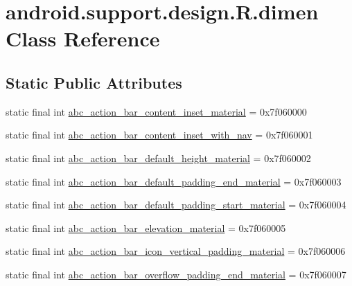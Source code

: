\hypertarget{classandroid_1_1support_1_1design_1_1_r_1_1dimen}{}\section{android.\+support.\+design.\+R.\+dimen Class Reference}
\label{classandroid_1_1support_1_1design_1_1_r_1_1dimen}
\subsection*{Static Public Attributes}
\begin{DoxyCompactItemize}
\item 
static final int \mbox{\hyperlink{classandroid_1_1support_1_1design_1_1_r_1_1dimen_af42ca9b71c928b25b27c7037a575693b}{abc\+\_\+action\+\_\+bar\+\_\+content\+\_\+inset\+\_\+material}} = 0x7f060000
\item 
static final int \mbox{\hyperlink{classandroid_1_1support_1_1design_1_1_r_1_1dimen_ade3bf521e9059c2181c240a1ad284b46}{abc\+\_\+action\+\_\+bar\+\_\+content\+\_\+inset\+\_\+with\+\_\+nav}} = 0x7f060001
\item 
static final int \mbox{\hyperlink{classandroid_1_1support_1_1design_1_1_r_1_1dimen_ab992b60379bc68bf6d348760955ad8a6}{abc\+\_\+action\+\_\+bar\+\_\+default\+\_\+height\+\_\+material}} = 0x7f060002
\item 
static final int \mbox{\hyperlink{classandroid_1_1support_1_1design_1_1_r_1_1dimen_a25e4e04e667bdfbbf4bcdbced1b7d1b4}{abc\+\_\+action\+\_\+bar\+\_\+default\+\_\+padding\+\_\+end\+\_\+material}} = 0x7f060003
\item 
static final int \mbox{\hyperlink{classandroid_1_1support_1_1design_1_1_r_1_1dimen_a0a52034a97ad09c75057adcb3a6022b1}{abc\+\_\+action\+\_\+bar\+\_\+default\+\_\+padding\+\_\+start\+\_\+material}} = 0x7f060004
\item 
static final int \mbox{\hyperlink{classandroid_1_1support_1_1design_1_1_r_1_1dimen_a9896c4c4f0debb01001db62e083c80c7}{abc\+\_\+action\+\_\+bar\+\_\+elevation\+\_\+material}} = 0x7f060005
\item 
static final int \mbox{\hyperlink{classandroid_1_1support_1_1design_1_1_r_1_1dimen_a45c3c747b19ec74e55fa8033393d1ac8}{abc\+\_\+action\+\_\+bar\+\_\+icon\+\_\+vertical\+\_\+padding\+\_\+material}} = 0x7f060006
\item 
static final int \mbox{\hyperlink{classandroid_1_1support_1_1design_1_1_r_1_1dimen_a953114168a0144f2305101244e1eb4bd}{abc\+\_\+action\+\_\+bar\+\_\+overflow\+\_\+padding\+\_\+end\+\_\+material}} = 0x7f060007

\end{DoxyCompactItemize}
